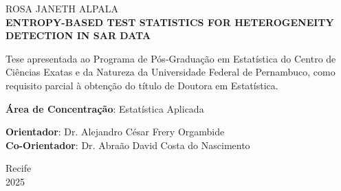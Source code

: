 \pagestyle{empty}        %

\begin{titlepage}
  \thispagestyle{empty}
    \begin{center}
    {\normalsize ROSA JANETH ALPALA}\\[5cm]
    {\normalsize \textbf{ENTROPY-BASED TEST STATISTICS FOR HETEROGENEITY DETECTION IN SAR DATA}}\\[3cm]
  \end{center}

  \noindent
  \hspace*{0.44\textwidth}
  \begin{minipage}{0.52\textwidth}
  \onehalfspacing
  Tese apresentada ao Programa de Pós-Graduação em Estatística do Centro de Ciências
  Exatas e da Natureza da Universidade Federal
  de Pernambuco, como requisito parcial à
  obtenção do título de Doutora em Estatística.
    
  \vspace{2em}
    \textbf{Área de Concentração}: Estatística Aplicada
    
    \vspace{2em} 
    \textbf{Orientador}: Dr. Alejandro César Frery Orgambide \\
    \textbf{Co-Orientador}: Dr. Abraão David Costa do Nascimento
  \end{minipage}
  
  \vfill
  \begin{center}
    Recife\\
    2025
  \end{center}
\end{titlepage}
\setcounter{page}{2}
\clearpage
\thispagestyle{empty}
\null
\newpage



